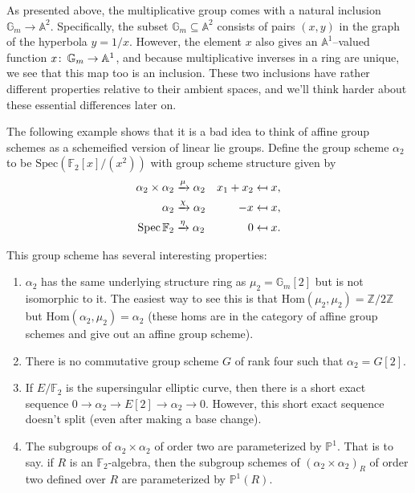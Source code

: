 \begin{remark}
As presented above, the multiplicative group comes with a natural inclusion $\mathbb G_m \to \mathbb A^2$.  Specifically, the subset $\mathbb G_m \subseteq \mathbb A^2$ consists of pairs $(x, y)$ in the graph of the hyperbola $y = 1/x$.  However, the element $x$ also gives an $\mathbb A^1$--valued function $x\colon\thinspace \mathbb G_m \to \mathbb A^1$, and because multiplicative inverses in a ring are unique, we see that this map too is an inclusion.  These two inclusions have rather different properties relative to their ambient spaces, and we'll think harder about these essential differences later on.
\end{remark}

\begin{example}
The following example shows that it is a bad idea to think of affine group schemes as a schemeified version of linear lie groups.  Define the group scheme $\alpha_2$ to be $\mathrm{Spec}(\mathbb{F}_2[x]/(x^2))$ with group scheme structure given by
\begin{align*}
\alpha_2 \times \alpha_2 &\xrightarrow{\mu} \alpha_2 & x_1 + x_2 & \mapsfrom x, \\
\alpha_2 & \xrightarrow{\chi} \alpha_2 & -x & \mapsfrom x, \\
\operatorname{Spec} \mathbb F_2 & \xrightarrow{\eta} \alpha_2 & 0 & \mapsfrom x.
\end{align*}

This group scheme has several interesting properties:
\begin{enumerate}
\item $\alpha_2$ has the same underlying structure ring as $\mu_2 = \mathbb{G}_m[2]$ but is not isomorphic to it.  The easiest way to see this is that $\mathrm{Hom}(\mu_2, \mu_2) = \mathbb{Z}/2\mathbb{Z}$ but $\mathrm{Hom}(\alpha_2, \mu_2) = \alpha_2$ (these homs are in the category of affine group schemes and give out an affine group scheme).  
\item There is no commutative group scheme $G$ of rank four such that $\alpha_2 = G[2]$.
\item If $E/\mathbb{F}_2$ is the supersingular elliptic curve, then there is a short exact sequence $0 \rightarrow \alpha_2 \rightarrow E[2] \rightarrow \alpha_2 \rightarrow 0$.  However, this short exact sequence doesn't split (even after making a base change).
\item The subgroups of $\alpha_2 \times \alpha_2$ of order two are parameterized by $\mathbb{P}^1$.  That is to say. if $R$ is an $\mathbb{F}_2$-algebra, then the subgroup schemes of $(\alpha_2 \times \alpha_2)_R$ of order two defined over $R$ are parameterized by $\mathbb{P}^1(R)$.
\end{enumerate}
\end{example}


